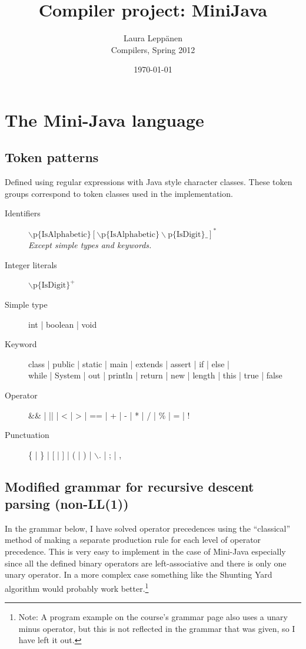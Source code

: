 \documentclass[a4paper,11pt]{article}
\begin{document}
\title{Compiler project: MiniJava}
\author{Laura Leppänen \\ Compilers, Spring 2012}
\date{\today}
\maketitle
\thispagestyle{empty}

\tableofcontents
\onehalfspacing

\newpage
\setcounter{page}{1}

\section{The Mini-Java language}

\subsection{Token patterns}

Defined using regular expressions with Java style character classes. These token groups correspond to token classes used in the implementation.

\begin{description}
\item[Identifiers] $\backslash\text{p\{IsAlphabetic\}} [ \backslash\text{p\{IsAlphabetic\}}\backslash\text{p\{IsDigit\}\_ } ]^{*}$ \\ \emph{Except simple types and keywords.}
\item[Integer literals] $\backslash\text{p\{IsDigit\}}^{+}$
\item[Simple type] int | boolean | void
\item[Keyword] class | public | static | main | extends | assert | if | else | \\ while | System | out | println | return | new | length | this | true | false
\item[Operator] \&\& | || | < | > | == | + | - | *  | / | \% | = | !
\item[Punctuation] \{ | \} | [ | ] | ( | ) | $\backslash$. | ; | ,
\end{description}

\subsection{Modified grammar for recursive descent parsing (non-LL(1))}

In the grammar below, I have solved operator precedences using the ``classical'' method of making a separate production rule for each level of operator precedence. This is very easy to implement in the case of Mini-Java especially since all the defined binary operators are left-associative and there is only one unary operator. In a more complex case something like the Shunting Yard algorithm would probably work better.\footnote{Note: A program example on the course's grammar page also uses a unary minus operator, but this is not reflected in the grammar that was given, so I have left it out.}
\end{document}
